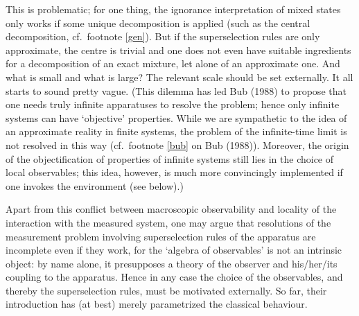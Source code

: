 This is problematic; for one thing, the ignorance interpretation of mixed
states only works if
some unique decomposition is applied (such as the central decomposition, cf.\
footnote \ref{gen}).
But if the superselection rules are only approximate, the centre is trivial and
one does not even
have  suitable ingredients for a decomposition of an exact mixture, let alone
of an approximate
one.
 And what is small and what is large? The relevant
scale should be set externally.
It all starts to sound pretty vague. (This dilemma has led Bub (1988)
  to propose that one needs truly infinite apparatuses to resolve the problem;
hence only
infinite systems can have `objective' properties.  While we are sympathetic to
the idea of an
approximate reality in finite systems, the problem of the infinite-time limit
is not resolved in this
way (cf.\  footnote \ref{bub} on  Bub (1988)). Moreover, the origin of the
objectification of
properties of infinite systems still lies in the choice of local observables;
this idea, however, is
much more convincingly implemented if one invokes the environment (see below).)



Apart from this conflict between macroscopic observability and locality of the
interaction with the
measured system, one may argue that resolutions of the measurement problem
involving superselection
rules of the apparatus are incomplete even if they work, for the `algebra of
observables' is not an
intrinsic object: by name alone, it presupposes a theory of the observer and
his/her/its coupling to
the apparatus. Hence in any case the choice of the observables, and thereby the
superselection rules,
must be motivated externally. So far, their introduction has (at best) merely
parametrized the
classical behaviour.
